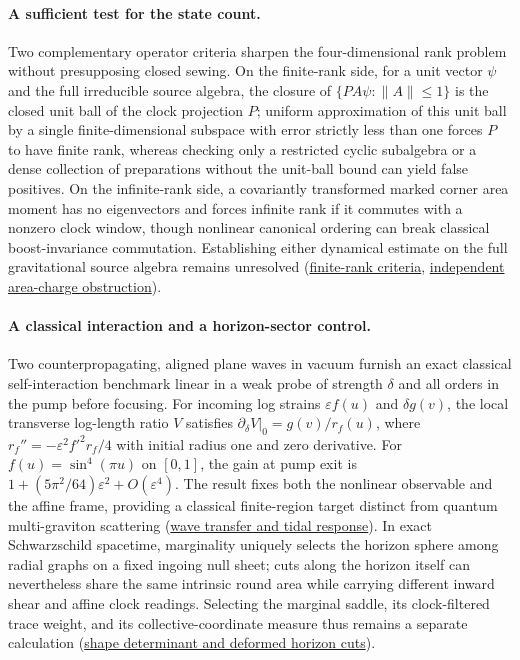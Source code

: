 \documentclass[10pt,a4paper]{article}
\numberwithin{equation}{section}
\newcommand{\repo}[2]{\href{https://github.com/sprajs/quantum-gravity/blob/main/#1}{#2}}
\begin{document}
\paragraph{A sufficient test for the state count.}
Two complementary operator criteria sharpen the four-dimensional rank problem without presupposing closed sewing. On the finite-rank side, for a unit vector $\psi$ and the full irreducible source algebra, the closure of $\{PA\psi:\|A\|\le1\}$ is the closed unit ball of the clock projection $P$; uniform approximation of this unit ball by a single finite-dimensional subspace with error strictly less than one forces $P$ to have finite rank, whereas checking only a restricted cyclic subalgebra or a dense collection of preparations without the unit-ball bound can yield false positives. On the infinite-rank side, a covariantly transformed marked corner area moment has no eigenvectors and forces infinite rank if it commutes with a nonzero clock window, though nonlinear canonical ordering can break classical boost-invariance commutation. Establishing either dynamical estimate on the full gravitational source algebra remains unresolved (\repo{audit/sewing-repair.md}{finite-rank criteria}, \repo{audit/corner-commutant.md}{independent area-charge obstruction}).

\paragraph{A classical interaction and a horizon-sector control.}
Two counterpropagating, aligned plane waves in vacuum furnish an exact classical self-interaction benchmark linear in a weak probe of strength $\delta$ and all orders in the pump before focusing. For incoming log strains $\varepsilon f(u)$ and $\delta g(v)$, the local transverse log-length ratio $V$ satisfies $\partial_\delta V|_0=g(v)/r_f(u)$, where $r_f''=-\varepsilon^2 f'^2 r_f/4$ with initial radius one and zero derivative. For $f(u)=\sin^4(\pi u)$ on $[0,1]$, the gain at pump exit is $1+(5\pi^2/64)\varepsilon^2+O(\varepsilon^4)$. The result fixes both the nonlinear observable and the affine frame, providing a classical finite-region target distinct from quantum multi-graviton scattering (\repo{audit/interacting-test.md}{wave transfer and tidal response}). In exact Schwarzschild spacetime, marginality uniquely selects the horizon sphere among radial graphs on a fixed ingoing null sheet; cuts along the horizon itself can nevertheless share the same intrinsic round area while carrying different inward shear and affine clock readings. Selecting the marginal saddle, its clock-filtered trace weight, and its collective-coordinate measure thus remains a separate calculation (\repo{audit/entropy-determinant.md}{shape determinant and deformed horizon cuts}).
\end{document}
